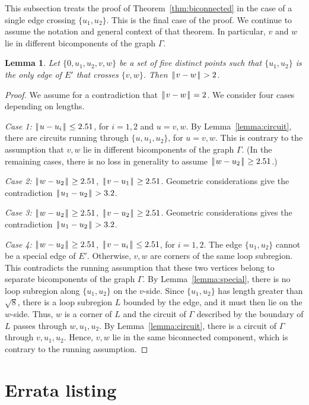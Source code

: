 \documentclass[11pt]{amsart}
\def\|{{\hskip0.1em|\hskip-0.15em|\hskip0.1em}}
\newtheorem{lemma}{Lemma}
\begin{document}
This subsection treats the proof of Theorem~\ref{thm:biconnected}
in the case of a single edge crossing $\{u_1,u_2\}$.  This is
the final case of the proof.
We continue to assume the notation and general context of that theorem.
In particular,  $v$ and $w$ lie in different bicomponents of
the graph $\Gamma$.

\begin{lemma}  Let $\{0,u_1,u_2,v,w\}$ be a set of five distinct
points such that $\{u_1,u_2\}$ is the only edge of $E'$ that
crosses $\{v,w\}$.  Then $\|v-w\|>2$.
\end{lemma}

\begin{proof} We assume for a contradiction that $\|v-w\|=2$.
We consider four cases depending on lengths.  

{\it Case 1:} $\|u-u_i\|\le 2.51$, for $i=1,2$ and $u=v,w$.
By Lemma~\ref{lemma:circuit}, there are circuits running through
$\{u,u_1,u_2\}$, for $u=v,w$.  This is contrary to the assumption
that $v,w$ lie in different bicomponents of the graph $\Gamma$.  (In the remaining cases, there is
no loss in generality to assume $\|w-u_2\|\ge 2.51$.)

{\it Case 2:} $\|w-u_2\|\ge 2.51$, $\|v-u_1\|\ge 2.51$.
Geometric considerations give the contradiction
$\|u_1-u_2\|>3.2$.

{\it Case 3:} $\|w-u_2\|\ge 2.51$, $\|v-u_2\|\ge 2.51$.
Geometric considerations gives the contradiction
$\|u_1-u_2\|>3.2$.

{\it Case 4:} $\|w-u_2\|\ge 2.51$, $\|v-u_i\|\le 2.51$, for $i=1,2$.
The edge $\{u_1,u_2\}$ cannot be a special edge of $E'$.  Otherwise,
$v,w$ are corners of the same loop subregion.  This contradicts
the running assumption that these two vertices belong to separate
bicomponents of the graph $\Gamma$.  By Lemma~\ref{lemma:special}, there is no loop subregion along $\{u_1,u_2\}$ on the $v$-side.
Since $\{u_1,u_2\}$ has length greater than $\sqrt8$, there
is a loop subregion $L$ bounded by the edge, and it must then lie
on the $w$-side.  Thus, $w$ is a corner of $L$ and the circuit of
$\Gamma$ described by the boundary of $L$ passes through $w,u_1,u_2$.
By Lemma~\ref{lemma:circuit}, there is a circuit of $\Gamma$ through
$v,u_1,u_2$.  Hence, $v,w$ lie in the same biconnected component,
which is contrary to the running assumption.
\end{proof}



\section{Errata listing}
\end{document}
